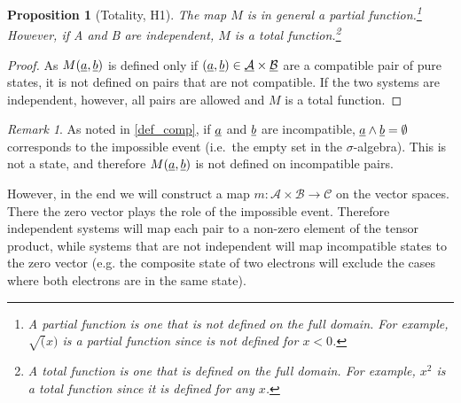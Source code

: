 \documentclass[aps,prl,amsmath,amssymb,twocolumn,nofootinbib]{revtex4}
\theoremstyle{plain}
\newtheorem{prop}[thrm]{Proposition}
\theoremstyle{definition}
\theoremstyle{remark}
\newtheorem*{remark}{Remark}
\newcommand{\pj}[1] {\underbar{$#1$}}
\begin{document}
	\begin{prop}[Totality, H1]\label{prop_totality}
		The map $M$ is in general a partial function.\footnote{A partial
			function is one that is not defined on the full domain. For
			example, $\sqrt(x)$ is a partial function since is not defined for
			$x<0$.} However, if A and B are independent, $M$ is a total function.\footnote{A total function is one that is defined on the full domain. For example, $x^2$ is a total function since it is defined for any $x$.}
	\end{prop}
	\begin{proof}
		As $M(\pj{a},\pj{b})$ is defined only if $(\pj{a},\pj{b}) \in \pj{\mathcal{A}}\times\pj{\mathcal{B}}$ are a compatible pair of pure states, it is not defined on pairs that are not compatible. If the two systems are independent, however, all pairs are allowed and $M$ is a total function.
	\end{proof}
	
	\begin{remark}
		As noted in \ref{def_comp}, if $\pj{a}$ and $\pj{b}$ are incompatible, $\pj{a} \wedge \pj{b}=\emptyset$ corresponds to the impossible event (i.e.~the empty set in the $\sigma$-algebra). This is not a state, and therefore $M(\pj{a},\pj{b})$ is not defined on incompatible pairs.
		
		However, in the end we will construct a map $m : \mathcal{A} \times \mathcal{B} \to \mathcal{C}$ on the vector spaces. There the zero vector plays the role of the impossible event. Therefore independent systems will map each pair to a non-zero element of the tensor product, while systems that are not independent will map incompatible states to the zero vector (e.g. the composite state of two electrons will exclude the cases where both electrons are in the same state).
	\end{remark}
	
\end{document}

